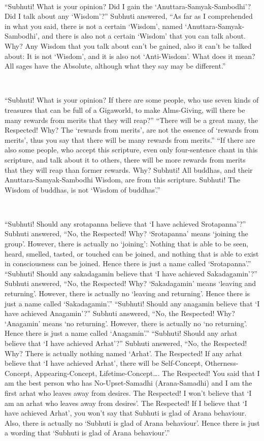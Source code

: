 \documentclass[a5paper,12pt]{book}
\begin{document}
    ~

     ``Subhuti! What is your opinion? Did I gain the `Anuttara-Samyak-Sambodhi'? Did I talk about any `Wisdom'?'' Subhuti answered, ``As far as I comprehended in what you said, there is not a certain `Wisdom', named `Anuttara-Samyak-Sambodhi', and there is also not a certain `Wisdom' that you can talk about. Why? Any Wisdom that you talk about can't be gained, also it can't be talked about: It is not `Wisdom', and it is also not `Anti-Wisdom'. What does it mean? All sages have the Absolute, although what they say may be different.''

    ~

     ``Subhuti! What is your opinion? If there are some people, who use seven kinds of treasures that can be full of a Gigaworld, to make Alms-Giving, will there be many rewards from merits that they will reap?'' ``There will be a great many, the Respected! Why? The `rewards from merits', are not the essence of `rewards from merits', thus you say that there will be many rewards from merits.'' ``If there are also some people, who accept this scripture, even only four-sentence chant in this scripture, and talk about it to others, there will be more rewards from merits that they will reap than former rewards. Why? Subhuti! All buddhas, and their Anuttara-Samyak-Sambodhi Wisdom, are from this scripture. Subhuti! The Wisdom of buddhas, is not `Wisdom of buddhas'.''

    ~

     ``Subhuti! Should any srotapanna believe that `I have achieved Srotapanna'?'' Subhuti answered, ``No, the Respected! Why? `Srotapanna' means `joining the group'. However, there is actually no `joining': Nothing that is able to be seen, heard, smelled, tasted, or touched can be joined, and nothing that is able to exist in consciousness can be joined. Hence there is just a name called `Srotapanna'.'' ``Subhuti! Should any sakadagamin believe that `I have achieved Sakadagamin'?'' Subhuti answered, ``No, the Respected! Why? `Sakadagamin' means `leaving and returning'. However, there is actually no `leaving and returning'. Hence there is just a name called `Sakadagamin'.'' ``Subhuti! Should any anagamin believe that `I have achieved Anagamin'?'' Subhuti answered, ``No, the Respected! Why? `Anagamin' means `no returning'. However, there is actually no `no returning'. Hence there is just a name called `Anagamin'.'' ``Subhuti! Should any arhat believe that `I have achieved Arhat'?'' Subhuti answered, ``No, the Respected! Why? There is actually nothing named `Arhat'. The Respected! If any arhat believe that `I have achieved Arhat', there will be Self-Concept, Otherness-Concept, Appearing-Concept, Lifetime-Concept\dots{}. The Respected! You said that I am the best person who has No-Upset-Samadhi (Arana-Samadhi) and I am the first arhat who leaves away from desires. The Respected! I won't believe that `I am an arhat who leaves away from desires'. The Respected! If I believe that `I have achieved Arhat', you won't say that Subhuti is glad of Arana behaviour. Also, there is actually no `Subhuti is glad of Arana behaviour'. Hence there is just a wording that `Subhuti is glad of Arana behaviour'.''
\end{document}

